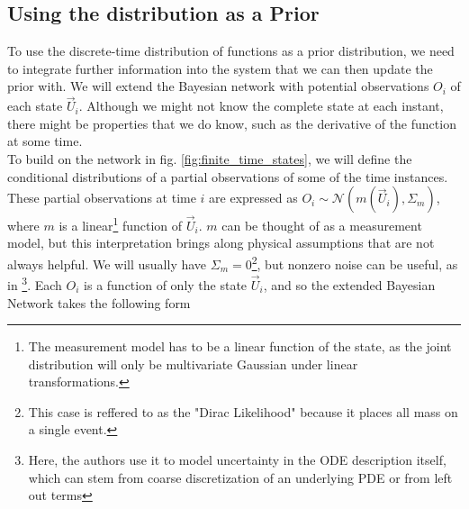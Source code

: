 \subsection*{Using the distribution as a Prior}
To use the discrete-time distribution of functions as a prior distribution, we need to integrate further information into the system that we can then update the prior with. We will extend the Bayesian network with potential observations $O_i$ of each state $\vec{U}_i$. Although we might not know the complete state at each instant, there might be properties that we do know, such as the derivative of the function at some time. 
\\ To build on the network in fig. \ref{fig:finite_time_states}, we will define the conditional distributions of a partial observations of some of the time instances. These partial observations at time $i$ are expressed as $O_i \sim \mathcal{N}(m(\vec{U}_i), \Sigma_m)$, where $m$ is a linear\footnote{The measurement model has to be a linear function of the state, as the joint distribution will only be multivariate Gaussian under linear transformations.} function of $\vec{U}_i$. $m$ can be thought of as a measurement model, but this interpretation brings along physical assumptions that are not always helpful. We will usually have $\Sigma_m = \mathcal{0}$\footnote{This case is reffered to as the "Dirac Likelihood" \cite{exponential_probabilistic} because it places all mass on a single event.}, but nonzero noise can be useful, as in \cite{pnmol}\footnote{Here, the authors use it to model uncertainty in the ODE description itself, which can stem from coarse discretization of an underlying PDE or from left out terms}.
Each $O_i$ is a function of only the state $\vec{U}_i$, and so the extended Bayesian Network takes the following form
